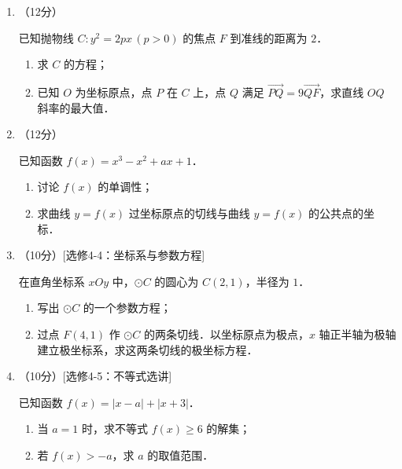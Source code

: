 \begin{description}
\begin{enumerate}[leftmargin=5pt]
        \item （12分）

        已知抛物线 $C:y^2=2px\,(p>0)$ 的焦点 $F$ 到准线的距离为 $2$．

        \begin{enumerate}[label=(\arabic*)]
            \item 求 $C$ 的方程；
            \item 已知 $O$ 为坐标原点，点 $P$ 在 $C$ 上，点 $Q$ 满足 $\overrightarrow{PQ}=9\overrightarrow{QF}$，求直线 $OQ$ 斜率的最大值．
        \end{enumerate}

        \item （12分）

        已知函数 $f(x)=x^3-x^2+ax+1$．

        \begin{enumerate}[label=(\arabic*)]
            \item 讨论 $f(x)$ 的单调性；
            \item 求曲线 $y=f(x)$ 过坐标原点的切线与曲线 $y=f(x)$ 的公共点的坐标．
        \end{enumerate}

        \item （10分）[选修4-4：坐标系与参数方程]

        在直角坐标系 $xOy$ 中，$\odot C$ 的圆心为 $C(2,1)$，半径为 $1$．

        \begin{enumerate}[label=(\arabic*)]
            \item 写出 $\odot C$ 的一个参数方程；
            \item 过点 $F(4,1)$ 作 $\odot C$ 的两条切线．以坐标原点为极点，$x$ 轴正半轴为极轴建立极坐标系，求这两条切线的极坐标方程．
        \end{enumerate}

        \item （10分）[选修4-5：不等式选讲]

        已知函数 $f(x)=|x-a|+|x+3|$．

        \begin{enumerate}[label=(\arabic*)]
            \item 当 $a=1$ 时，求不等式 $f(x)\geqslant6$ 的解集；
            \item 若 $f(x)>-a$，求 $a$ 的取值范围．
        \end{enumerate}
    \end{enumerate}
\end{description}
\clearpage


